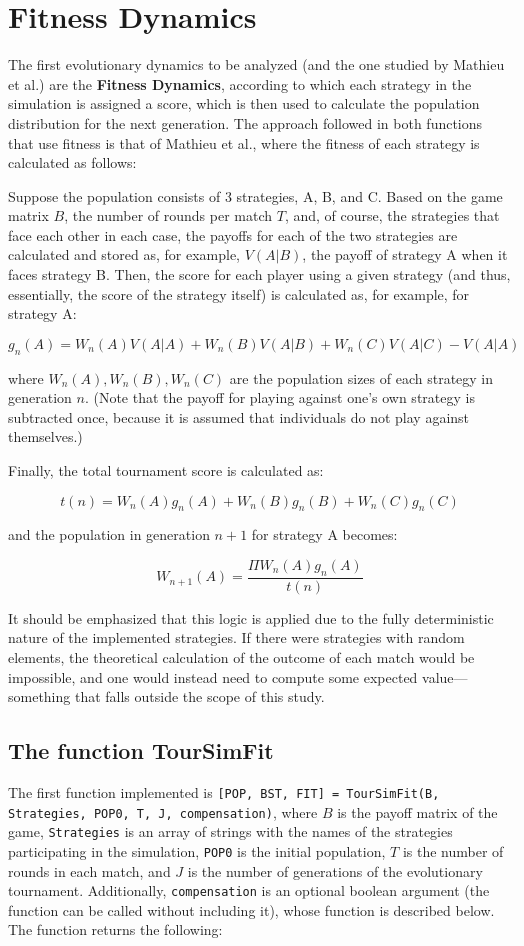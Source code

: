 \section{Fitness Dynamics}

The first evolutionary dynamics to be analyzed (and the one studied by Mathieu et al.) are the \textbf{Fitness Dynamics}, according to which each strategy in the simulation is assigned a score, which is then used to calculate the population distribution for the next generation. The approach followed in both functions that use fitness is that of Mathieu et al., where the fitness of each strategy is calculated as follows:

Suppose the population consists of 3 strategies, A, B, and C. Based on the game matrix $B$, the number of rounds per match $T$, and, of course, the strategies that face each other in each case, the payoffs for each of the two strategies are calculated and stored as, for example, $V(A|B)$, the payoff of strategy A when it faces strategy B. Then, the score for each player using a given strategy (and thus, essentially, the score of the strategy itself) is calculated as, for example, for strategy A:

\[
g_n(A) = W_n(A)V(A|A) + W_n(B)V(A|B) + W_n(C)V(A|C) - V(A|A)
\]

where $W_n(A), W_n(B), W_n(C)$ are the population sizes of each strategy in generation $n$. (Note that the payoff for playing against one’s own strategy is subtracted once, because it is assumed that individuals do not play against themselves.)

Finally, the total tournament score is calculated as:

\[
t(n) = W_n(A)g_n(A) + W_n(B)g_n(B) + W_n(C)g_n(C)
\]

and the population in generation $n+1$ for strategy A becomes:

\[
W_{n+1}(A) = \frac{\Pi W_n(A)g_n(A)}{t(n)}
\]

It should be emphasized that this logic is applied due to the fully deterministic nature of the implemented strategies. If there were strategies with random elements, the theoretical calculation of the outcome of each match would be impossible, and one would instead need to compute some expected value---something that falls outside the scope of this study.
\subsection{The function TourSimFit}
The first function implemented is \texttt{[POP, BST, FIT] = TourSimFit(B, Strategies, POP0, T, J, compensation)}, where $B$ is the payoff matrix of the game, \texttt{Strategies} is an array of strings with the names of the strategies participating in the simulation, \texttt{POP0} is the initial population, $T$ is the number of rounds in each match, and $J$ is the number of generations of the evolutionary tournament. Additionally, \texttt{compensation} is an optional boolean argument (the function can be called without including it), whose function is described below. The function returns the following:

